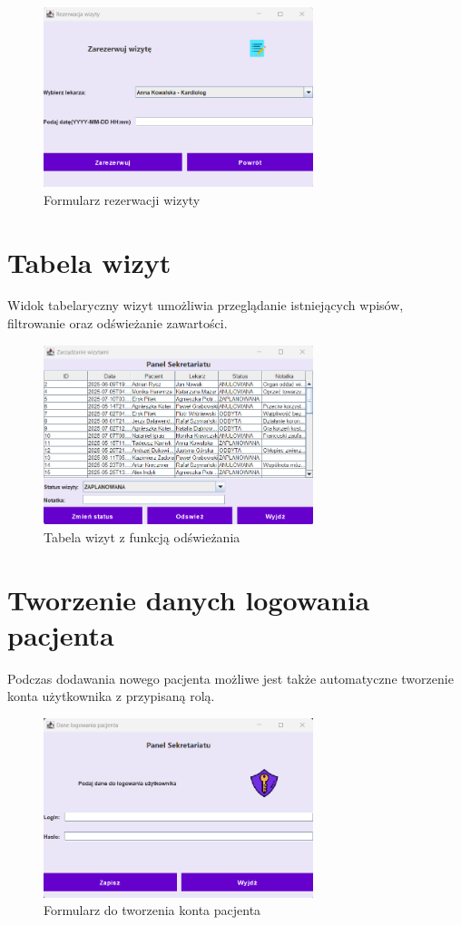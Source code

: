 \begin{figure}[H]
\centering
\includegraphics[width=0.7\textwidth]{figures/ReserveVisit.png}
\caption{Formularz rezerwacji wizyty}
\end{figure}

\section{Tabela wizyt}
Widok tabelaryczny wizyt umożliwia przeglądanie istniejących wpisów, filtrowanie oraz odświeżanie zawartości.

\begin{figure}[H]
\centering
\includegraphics[width=0.7\textwidth]{figures/visit_table.png}
\caption{Tabela wizyt z funkcją odświeżania}
\end{figure}

\clearpage
\section{Tworzenie danych logowania pacjenta}
Podczas dodawania nowego pacjenta możliwe jest także automatyczne tworzenie konta użytkownika z przypisaną rolą.

\begin{figure}[H]
\centering
\includegraphics[width=0.7\textwidth]{figures/login_data.png}
\caption{Formularz do tworzenia konta pacjenta}
\end{figure}
